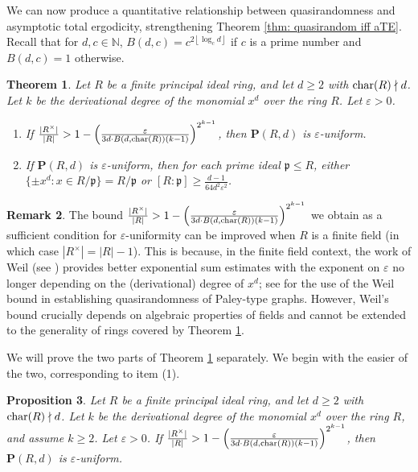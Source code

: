 \documentclass{amsart}
\newtheorem{theorem}{Theorem}[section]
\newtheorem{proposition}[theorem]{Proposition}
\theoremstyle{definition}
\newtheorem{remark}[theorem]{Remark}
\numberwithin{equation}{section}
\newcommand{\N}{\mathbb{N}}
\newcommand{\p}{\mathfrak{p}}
\newcommand{\bfP}{\mathbf{P}}
\newcommand{\eps}{\varepsilon}
\newcommand{\floor}[1]{\left\lfloor #1 \right\rfloor}
\renewcommand{\char}{\textup{char}}
\begin{document}
We can now produce a quantitative relationship between quasirandomness and asymptotic total ergodicity, strengthening Theorem \ref{thm: quasirandom iff aTE}.
Recall that for $d, c \in \N$, $B(d,c) = c^{2\floor{\log_c{d}}}$ if $c$ is a prime number and $B(d,c) = 1$ otherwise.

\begin{theorem} \label{thm: quasirandom}
    Let $R$ be a finite principal ideal ring, and let $d \ge 2$ with $\textup{char}(R) \nmid d$.
	Let $k$ be the derivational degree of the monomial $x^d$ over the ring $R$.
	Let $\eps > 0$.
	\begin{enumerate}[(1)]
		\item	If $\frac{|R^{\times}|}{|R|} > 1 - \left( \frac{\eps}{3d \cdot B(d,\char(R)) (k-1)} \right)^{2^{k-1}}$, then $\bfP(R,d)$ is $\eps$-uniform.
		\item	If $\bfP(R,d)$ is $\eps$-uniform, then for each prime ideal $\p \le R$, either $\{\pm x^d : x \in R/\p\} = R/\p$ or $[R:\p] \ge \frac{d-1}{64d^2\eps^2}$.
	\end{enumerate}
\end{theorem}

\begin{remark}
    The bound $\frac{|R^{\times}|}{|R|} > 1 - \left( \frac{\eps}{3d \cdot B(d,\char(R)) (k-1)} \right)^{2^{k-1}}$ we obtain as a sufficient condition for $\eps$-uniformity can be improved when $R$ is a finite field (in which case $|R^{\times}| = |R| - 1$).
    This is because, in the finite field context, the work of Weil (see \cite[Theorem 3.2]{kowalski}) provides better exponential sum estimates with the exponent on $\eps$ no longer depending on the (derivational) degree of $x^d$; see \cite[Section 1.6]{ab_Sarkozy} for the use of the Weil bound in establishing quasirandomness of Paley-type graphs.
    However, Weil's bound crucially depends on algebraic properties of fields and cannot be extended to the generality of rings covered by Theorem \ref{thm: quasirandom}.
\end{remark}

We will prove the two parts of Theorem \ref{thm: quasirandom} separately.
We begin with the easier of the two, corresponding to item (1).

\begin{proposition}
    Let $R$ be a finite principal ideal ring, and let $d \ge 2$ with $\textup{char}(R) \nmid d$.
	Let $k$ be the derivational degree of the monomial $x^d$ over the ring $R$, and assume $k \ge 2$.
	Let $\eps > 0$.
	If $\frac{|R^{\times}|}{|R|} > 1 - \left( \frac{\eps}{3d \cdot B(d,\char(R)) (k-1)} \right)^{2^{k-1}}$, then $\bfP(R,d)$ is $\eps$-uniform.
\end{proposition}
\end{document}
